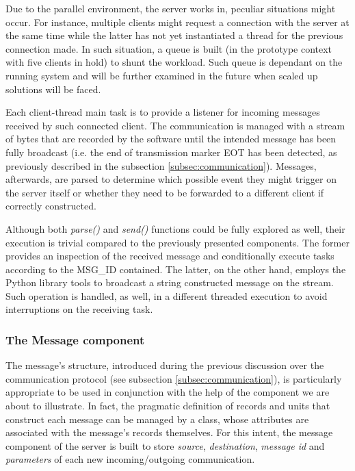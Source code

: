 \medskip
Due to the parallel environment, the server works in, peculiar situations might occur. For instance, multiple clients might request a connection with the server at the same time while the latter has not yet instantiated a thread for the previous connection made. In such situation, a queue is built (in the prototype context with five clients in hold) to shunt the workload. Such queue is dependant on the running system and will be further examined in the future when scaled up solutions will be faced.

\vspace{0.5cm}

\vspace{0.5cm}

Each client-thread main task is to provide a listener for incoming messages received by such connected client. The communication is managed with a stream of bytes that are recorded by the software until the intended message has been fully broadcast (i.e. the end of transmission marker EOT has been detected, as previously described in the subsection \ref{subsec:communication}). Messages, afterwards, are parsed to determine which possible event they might trigger on the server itself or whether they need to be forwarded to a different client if correctly constructed.

\vspace{0.5cm}

\vspace{0.5cm}

Although both \textit{parse()} and \textit{send()} functions could be fully explored as well, their execution is trivial compared to the previously presented components. The former provides an inspection of the received message and conditionally execute tasks according to the MSG\_ID contained. The latter, on the other hand, employs the Python library tools to broadcast a string constructed message on the stream. Such operation is handled, as well, in a different threaded execution to avoid interruptions on the receiving task.

\newpage
\subsubsection{The Message component}
The message's structure, introduced during the previous discussion over the communication protocol (see subsection \ref{subsec:communication}), is particularly appropriate to be used in conjunction with the help of the component we are about to illustrate. In fact, the pragmatic definition of records and units that construct each message can be managed by a class, whose attributes are associated with the message's records themselves. For this intent, the message component of the server is built to store \textit{source}, \textit{destination}, \textit{message id} and \textit{parameters} of each new incoming/outgoing communication.

